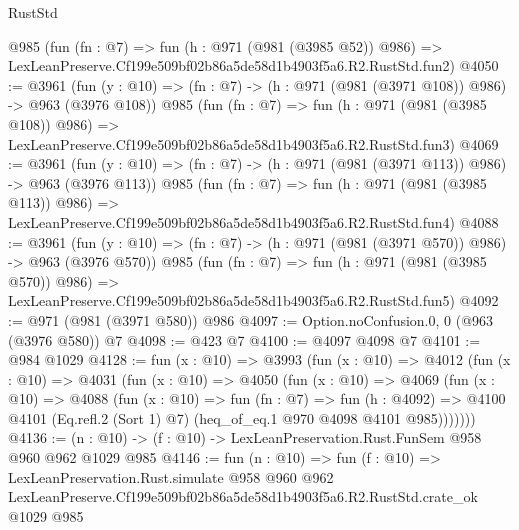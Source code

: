 \begin{lexlean}{RustStd}
\begin{coremodule}
    @985
    (fun (fn : @7) =>
    fun (h : @971 (@981 (@3985 @52)) @986) =>
    LexLeanPreserve.Cf199e509bf02b86a5de58d1b4903f5a6.R2.RustStd.fun2)
@4050 := @3961
    (fun (y : @10) => (fn : @7) -> (h : @971 (@981 (@3971 @108)) @986) -> @963 (@3976 @108))
    @985
    (fun (fn : @7) =>
    fun (h : @971 (@981 (@3985 @108)) @986) =>
    LexLeanPreserve.Cf199e509bf02b86a5de58d1b4903f5a6.R2.RustStd.fun3)
@4069 := @3961
    (fun (y : @10) => (fn : @7) -> (h : @971 (@981 (@3971 @113)) @986) -> @963 (@3976 @113))
    @985
    (fun (fn : @7) =>
    fun (h : @971 (@981 (@3985 @113)) @986) =>
    LexLeanPreserve.Cf199e509bf02b86a5de58d1b4903f5a6.R2.RustStd.fun4)
@4088 := @3961
    (fun (y : @10) => (fn : @7) -> (h : @971 (@981 (@3971 @570)) @986) -> @963 (@3976 @570))
    @985
    (fun (fn : @7) =>
    fun (h : @971 (@981 (@3985 @570)) @986) =>
    LexLeanPreserve.Cf199e509bf02b86a5de58d1b4903f5a6.R2.RustStd.fun5)
@4092 := @971 (@981 (@3971 @580)) @986
@4097 := Option.noConfusion.{0, 0} (@963 (@3976 @580)) @7
@4098 := @423 @7
@4100 := @4097 @4098 @7
@4101 := @984 @1029
@4128 := fun (x : @10) =>
  @3993
    (fun (x : @10) =>
    @4012
      (fun (x : @10) =>
      @4031
        (fun (x : @10) =>
        @4050
          (fun (x : @10) =>
          @4069
            (fun (x : @10) =>
            @4088
              (fun (x : @10) =>
              fun (fn : @7) =>
              fun (h : @4092) =>
              @4100 @4101 (Eq.refl.{2} (Sort 1) @7) (heq_of_eq.{1} @970 @4098 @4101 @985)))))))
@4136 := (n : @10) -> (f : @10) -> LexLeanPreservation.Rust.FunSem @958 @960 @962 @1029 @985
@4146 := fun (n : @10) =>
  fun (f : @10) =>
  LexLeanPreservation.Rust.simulate
    @958
    @960
    @962
    LexLeanPreserve.Cf199e509bf02b86a5de58d1b4903f5a6.R2.RustStd.crate_ok
    @1029
    @985
\end{coremodule}
\end{lexlean}

